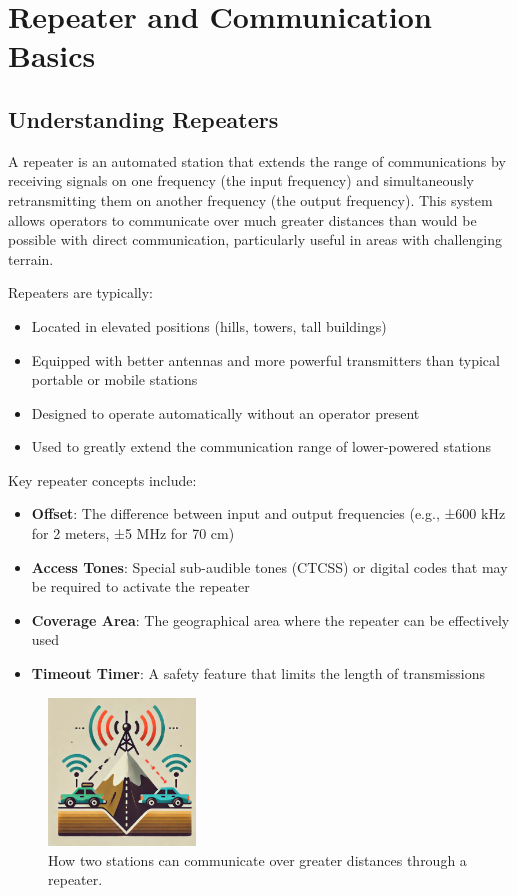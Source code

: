 \section{Repeater and Communication Basics}
\label{section:repeater_basics}

\subsection*{Understanding Repeaters}

A repeater is an automated station that extends the range of communications by receiving signals on one frequency (the input frequency) and simultaneously retransmitting them on another frequency (the output frequency). This system allows operators to communicate over much greater distances than would be possible with direct communication, particularly useful in areas with challenging terrain.


Repeaters are typically:
\begin{itemize}
    \item Located in elevated positions (hills, towers, tall buildings)
    \item Equipped with better antennas and more powerful transmitters than typical portable or mobile stations
    \item Designed to operate automatically without an operator present
    \item Used to greatly extend the communication range of lower-powered stations
\end{itemize}

Key repeater concepts include:
\begin{itemize}
    \item \textbf{Offset}: The difference between input and output frequencies (e.g., ±600 kHz for 2 meters, ±5 MHz for 70 cm)
    \item \textbf{Access Tones}: Special sub-audible tones (CTCSS) or digital codes that may be required to activate the repeater
    \item \textbf{Coverage Area}: The geographical area where the repeater can be effectively used
    \item \textbf{Timeout Timer}: A safety feature that limits the length of transmissions
\end{itemize}

\begin{figure}
    \centering
    \includegraphics[width=0.35\textwidth]{tech/organized/chapter_2/images/repeater.png}
    \caption{How two stations can communicate over greater distances through a repeater. }
    \label{fig:repeater_operation}
\end{figure}

